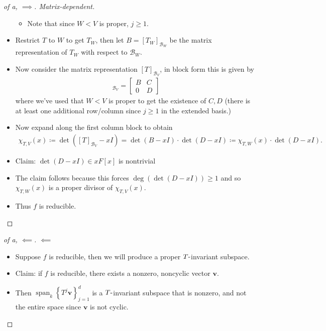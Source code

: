 \begin{solution}
\begin{proof}[of a, $\implies$. Matrix-dependent]
\begin{itemize}
  \begin{itemize}
  \tightlist
  \item
    Note that since \(W<V\) is proper, \(j\geq 1\).
  \end{itemize}
\item
  Restrict \(T\) to \(W\) to get \(T_W\), then let
  \(B = [T_W]_{{\mathcal{B}}_W}\) be the matrix representation of
  \(T_W\) with respect to \({\mathcal{B}}_W\).
\item
  Now consider the matrix representation \([T]_{{\mathcal{B}}_V}\), in
  block form this is given by
  \begin{align*}
  [T]_{{\mathcal{B}}_V} = 
  \begin{bmatrix}
  B & C \\
  0 & D
  \end{bmatrix}
  \end{align*}
  where we've used that \(W<V\) is proper to get the existence of
  \(C, D\) (there is at least one additional row/column since
  \(j\geq 1\) in the extended basis.) 
\item
  Now expand along the first column block to obtain
  \begin{align*}
  \chi_{T, V}(x) \coloneqq\det([T]_{{\mathcal{B}}_V} - xI) = \det(B - xI)\cdot \det(D - xI) \coloneqq\chi_{T, W}(x) \cdot \det(D-xI)
  .\end{align*}
\item
  Claim: \(\det(D - xI) \in xF[x]\) is nontrivial
\item
  The claim follows because this forces \(\deg(\det(D-xI)) \geq 1\) and
  so \(\chi_{T, W}(x)\) is a proper divisor of \(\chi_{T, V}(x)\).
\item
  Thus \(f\) is reducible.
\end{itemize}

\end{proof}

\begin{proof}[of a, $\impliedby$]

\(\impliedby\)

\begin{itemize}
\tightlist
\item
  Suppose \(f\) is reducible, then we will produce a proper
  \(T{\hbox{-}}\)invariant subspace.
\item
  Claim: if \(f\) is reducible, there exists a nonzero, noncyclic vector
  \(\mathbf{v}\).
\item
  Then \({\operatorname{span}}_k\left\{{T^j\mathbf{v}}\right\}_{j=1}^d\)
  is a \(T{\hbox{-}}\)invariant subspace that is nonzero, and not the
  entire space since \(\mathbf{v}\) is not cyclic.
\end{itemize}


\end{proof}
\end{solution}
